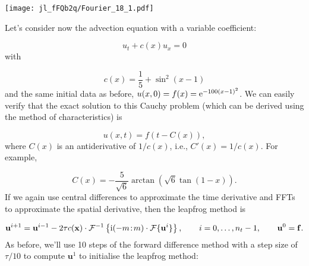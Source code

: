 \documentclass[12pt,a4paper]{article}
\begin{document}
\texttt{[image: jl\_fFQb2q/Fourier\_18\_1.pdf]}

Let's consider now the advection equation with a variable coefficient:

\[
u_t + c(x)u_x = 0
\]
with 

\[
c(x) = \frac{1}{5} + \sin^2(x-1)
\]
and the same initial data as before, $u(x,0) = f(x) = {\rm e}^{-100(x-1)^2}$.  We can easily verify that the exact solution to this Cauchy problem (which can be derived using the method of characteristics) is 

\[
u(x,t) = f\left(t - C(x)  \right),
\]
where $C(x)$ is an antiderivative of $1/c(x)$, i.e., $C'(x) = 1/c(x)$.    For example,

\[
C(x) = -\frac{5}{\sqrt{6}}\arctan \left(\sqrt{6}\tan(1-x)  \right).
\]
If we again use central differences to approximate the time derivative and FFTs to approximate the spatial derivative, then the leapfrog method is

\[
\mathbf{u}^{i+1} = \mathbf{u}^{i-1} - 2\tau c(\mathbf{x})\cdot \mathcal{F}^{-1}\left\lbrace {\rm i}(-m\!:\!m)\cdot\mathcal{F}\lbrace \mathbf{u}^{i} \rbrace\right\rbrace, \qquad i = 0, \ldots, n_t-1, \qquad \mathbf{u}^0 = \mathbf{f}.
\]
As before, we'll use 10 steps of the forward difference method with a step size of $\tau/10$ to compute $\mathbf{u}^{1}$ to initialise the leapfrog method:
\end{document}
